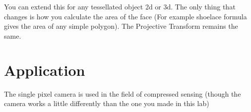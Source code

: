 You can extend this for any tessellated object 2d or 3d.
The only thing that changes is how you calculate the area of the face (For example shoelace formula gives the area of any simple polygon).
The Projective Transform remains the same. 

\section*{Application}
The single pixel camera is used in the field of compressed sensing (though the camera works a little differently than the one you made in this lab)
